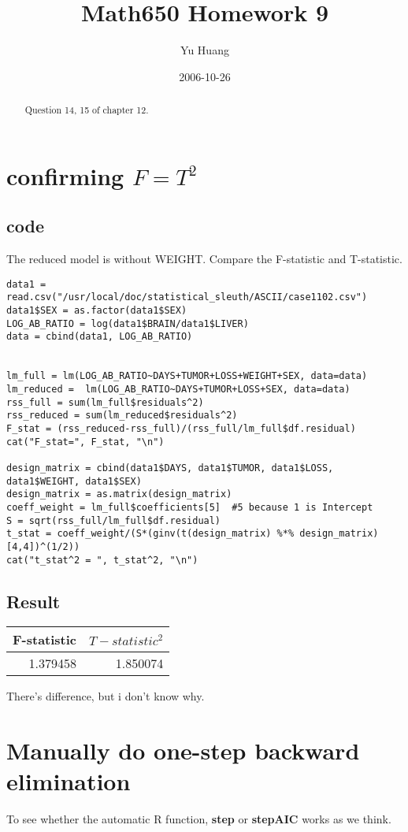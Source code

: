 \documentclass[a4paper,10pt]{article}
\title{Math650 Homework 9}
\author{Yu Huang}
\date{2006-10-26}
\begin{document}
\maketitle

\begin{abstract}
Question 14, 15 of chapter 12.
\end{abstract}

\section{confirming $F=T^2$}
\subsection{code}
The reduced model is without WEIGHT. Compare the F-statistic and T-statistic. 
\begin{verbatim}
data1 = read.csv("/usr/local/doc/statistical_sleuth/ASCII/case1102.csv")
data1$SEX = as.factor(data1$SEX)
LOG_AB_RATIO = log(data1$BRAIN/data1$LIVER)
data = cbind(data1, LOG_AB_RATIO)


lm_full = lm(LOG_AB_RATIO~DAYS+TUMOR+LOSS+WEIGHT+SEX, data=data)
lm_reduced =  lm(LOG_AB_RATIO~DAYS+TUMOR+LOSS+SEX, data=data)
rss_full = sum(lm_full$residuals^2)
rss_reduced = sum(lm_reduced$residuals^2)
F_stat = (rss_reduced-rss_full)/(rss_full/lm_full$df.residual)
cat("F_stat=", F_stat, "\n")

design_matrix = cbind(data1$DAYS, data1$TUMOR, data1$LOSS, data1$WEIGHT, data1$SEX)
design_matrix = as.matrix(design_matrix)
coeff_weight = lm_full$coefficients[5]	#5 because 1 is Intercept
S = sqrt(rss_full/lm_full$df.residual)
t_stat = coeff_weight/(S*(ginv(t(design_matrix) %*% design_matrix)[4,4])^(1/2))
cat("t_stat^2 = ", t_stat^2, "\n")
\end{verbatim}

\subsection{Result}
\begin{tabular}{|r|r|}
\hline
F-statistic & $T-statistic^2$\\
\hline
1.379458 & 1.850074 \\
\hline
\end{tabular}
There's difference, but i don't know why.

\section{Manually do one-step backward elimination}
To see whether the automatic R function, \textbf{step} or \textbf{stepAIC} works as we think.
\end{document}
